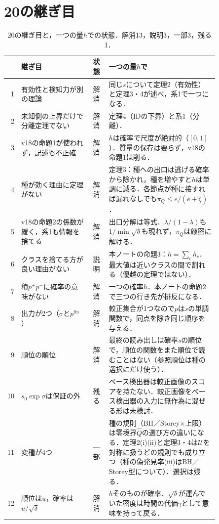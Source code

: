 \documentclass[a4paper,10pt,dvipdfmx]{jsarticle}
\theoremstyle{definition}
\newcommand{\cU}{\mathcal{U}}
\newcommand{\hQ}{\hat{Q}}
\newcommand{\pP}{p^{+}}
\newcommand{\pN}{p^{-}}
\newcommand{\pfin}{p^{\mathrm{fin}}}
\begin{document}
\section{20の継ぎ目}
\label{sec:seams}
\begin{table}[t]
\centering
\caption{20の継ぎ目と，一つの量$h$での状態．解消13，説明3，一部3，残る1．}
\label{tab:seams}
\footnotesize
\setlength{\tabcolsep}{3pt}
\renewcommand{\arraystretch}{1.12}
\begin{tabular}{rp{0.33\linewidth}cp{0.52\linewidth}}
\toprule
& 継ぎ目 & 状態 & 一つの量$h$で \\
\midrule
1 & 有効性と検知力が別の理論 & 解消 & 同じ$s$について定理2（有効性）と定理3・4が述べ，系1で一つになる．\\
2 & 未知側の上界だけで分離定理でない & 解消 & 定理4（IDの下界）と系1（分離）．\\
3 & v18の命題1が使われず，記述も不正確 & 解消 & $h$は確率で尺度が絶対的（$[0,1]$）．質量の保存は要らず，v18の命題1は削る．\\
4 & 種が効く理由に定理がない & 解消 & 定理3：種への出口は逃げる確率から除かれ，種を増やすと$h$は単調に減る．各節点が種に接すれば漏れなしでも$\pi_Q\le\bar e/(\bar e+\underline{\zeta})$．\\
5 & v18の命題2の係数が緩く，系1も情報を捨てる & 解消 & 出口分解は等式．$\lambda/(1-\lambda)$も$1/\min\sqrt{\delta}$も現れず，$\pi_Q$は厳密に解ける．\\
6 & クラスを捨てる方が良い理由がない & 説明 & 本ノートの命題3：$h=\sum_ch_c$．最大値は近いクラスの間で割れる（優越の定理ではない）．\\
7 & 積$\pP\pN$に確率の意味がない & 解消 & 一つの確率$h$．本ノートの命題2で三つの行き先が排反になる．\\
8 & 出力が2つ（$\sigma$と$\pfin$）& 解消 & 較正集合が1つなので$p$は$s$の単調関数で，同点を除き同じ順序を与える．\\
9 & 順位の順位 & 解消 & 最終の読み出しは確率$s$の順位で，順位の関数をまた順位で読むことはない（参照順位は種の選択にだけ使う）．\\
10 & $s_0\exp\sigma$は保証の外 & 残る & ベース検出器は較正画像のスコアを持たない．較正画像をベース検出器の入力に無作為に混ぜる形は未検討．\\
11 & 変種が4つ & 一部 & 種の規則（BH／Storey$\times$上限）は零境界$\hQ$の選び方の違いになる．定理2(i)(ii)と定理3・4は$\cU$を対称に扱うどの規則でも成り立つ（種の偽発見率(iii)はBH／Storey型について）．選択は残る．\\
12 & 順位は$u$，確率は$u/\sqrt{\delta}$ & 解消 & $h$そのものが確率．$\sqrt{\delta}$が運んでいた密度は時間の代価$\gamma$として意味を持って戻る．\\

\end{tabular}
\end{table}
\end{document}
